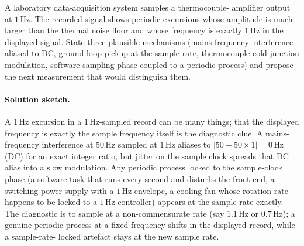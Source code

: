 \begin{exercise}
A laboratory data-acquisition system samples a thermocouple-
amplifier output at $1 \,\si{\hertz}$. The recorded signal shows
periodic excursions whose amplitude is much larger than the
thermal noise floor and whose frequency is exactly $1 \,\si
{\hertz}$ in the displayed signal. State three plausible mechanisms
(mains-frequency interference aliased to DC, ground-loop pickup at
the sample rate, thermocouple cold-junction modulation, software
sampling phase coupled to a periodic process) and propose the
next measurement that would distinguish them.

\paragraph{Solution sketch.}
A $1 \,\si{\hertz}$ excursion in a $1 \,\si{\hertz}$-sampled
record can be many things; that the displayed frequency is
exactly the sample frequency itself is the diagnostic clue. A
mains-frequency interference at $50 \,\si{\hertz}$ sampled at $1
\,\si{\hertz}$ aliases to $|50 - 50 \times 1| = 0 \,\si{\hertz}$
(DC) for an exact integer ratio, but jitter on the sample clock
spreads that DC alias into a slow modulation. Any periodic
process locked to the sample-clock phase (a software task that
runs every second and disturbs the front end, a switching power
supply with a $1 \,\si{\hertz}$ envelope, a cooling fan whose
rotation rate happens to be locked to a $1 \,\si{\hertz}$
controller) appears at the sample rate exactly. The diagnostic is
to sample at a non-commensurate rate (say $1.1 \,\si{\hertz}$ or
$0.7 \,\si{\hertz}$); a genuine periodic process at a fixed
frequency shifts in the displayed record, while a sample-rate-
locked artefact stays at the new sample rate.
\end{exercise}

